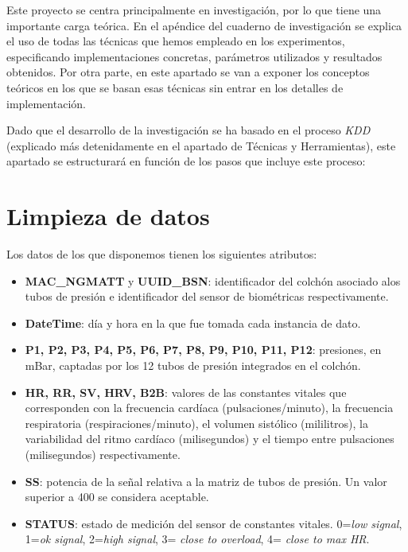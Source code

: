 \label{conceptos teoricos}

Este proyecto se centra principalmente en investigación, por lo que tiene una importante carga teórica. En el apéndice del cuaderno de investigación se explica el uso de todas las técnicas que hemos empleado en los experimentos, especificando implementaciones concretas, parámetros utilizados y resultados obtenidos. Por otra parte, en este apartado se van a exponer los conceptos teóricos en los que se basan esas técnicas sin entrar en los detalles de implementación.  

Dado que el desarrollo de la investigación se ha basado en el proceso \textit{KDD} (explicado más detenidamente en el apartado de Técnicas y Herramientas), este apartado se estructurará en función de los pasos que incluye este proceso: 

\section{Limpieza de datos}

Los datos de los que disponemos tienen los siguientes atributos: 

\begin{itemize}
	\item \textbf{MAC\_NGMATT} y \textbf{UUID\_BSN}: identificador del colchón asociado alos tubos de presión e identificador del sensor de biométricas respectivamente. 
	\item \textbf{DateTime}: día y hora en la que fue tomada cada instancia de dato. 
	\item \textbf{P1, P2, P3, P4, P5, P6, P7, P8, P9, P10, P11, P12}: presiones, en mBar, captadas por los 12 tubos de presión integrados en el colchón. 
	\item \textbf{HR, RR, SV, HRV, B2B}: valores de las constantes vitales que corresponden con la frecuencia cardíaca (pulsaciones/minuto), la frecuencia respiratoria (respiraciones/minuto), el volumen sistólico (mililitros), la variabilidad del ritmo cardíaco (milisegundos) y el tiempo entre pulsaciones (milisegundos) respectivamente. 
	\item \textbf{SS}: potencia de la señal relativa a la matriz de tubos de presión. Un valor superior a 400 se considera aceptable. 
	\item \textbf{STATUS}: estado de medición del sensor de constantes vitales. 0=\textit{low signal}, 1=\textit{ok signal}, 2=\textit{high signal}, 3= \textit{close to overload}, 4= \textit{close to max HR}. 
\end{itemize}

